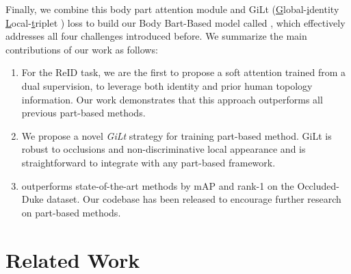 \documentclass[10pt,twocolumn,letterpaper]{article}
\begin{document}
Finally, we combine this body part attention module and GiLt (\underline{G}lobal-\underline{i}dentity \underline{L}ocal-\underline{t}riplet  ) loss to build our Body Bart-Based {\reid} model called {\model}, which effectively addresses all four challenges introduced before.
We summarize the main contributions of our work as follows:
\begin{enumerate}[noitemsep]

\item For the ReID task, we are the first to propose a soft attention trained from a dual supervision, to leverage both identity and prior human topology information. Our work demonstrates that this approach outperforms all previous part-based methods.
\item We propose a novel \textit{GiLt} strategy for training part-based method. GiLt is robust to occlusions and non-discriminative local appearance and is straightforward to integrate with any part-based framework.
\item {\model} outperforms state-of-the-art methods by  mAP and  rank-1 on the Occluded-Duke dataset. 
Our {\model} codebase has been released to encourage further research on part-based methods.
\end{enumerate}

























%
 

\section{Related Work}
\end{document}

